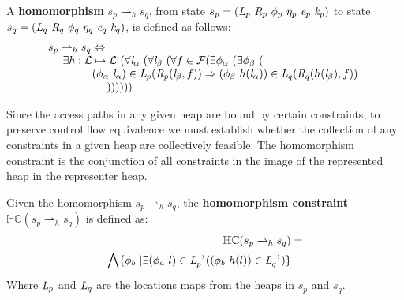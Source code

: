 \begin{definition}
\label{def:homomorphism}
A \textbf{homomorphism} $s_p \rightharpoonup_{h} s_q$, from state $s_p = ( \cfgnt{L}_p\ \cfgnt{R}_p\ \phi_p\ \eta_p\ \cfgnt{e}_p\ \cfgnt{k}_p )$ to state $s_q = ( \cfgnt{L}_q\ \cfgnt{R}_q\ \phi_q\ \eta_q\ \cfgnt{e}_q\ \cfgnt{k}_q )$, is defined as follows: 
$$
\begin{array}{l}
 s_p \rightharpoonup_{h} s_q \Leftrightarrow \\
\ \ \ \ \exists h: \mathcal{L} \mapsto \mathcal{L}\ (\forall \cfgnt{l}_\alpha\ (\forall \cfgnt{l}_\beta\ (\forall f \in \mathcal{F}( \exists \phi_\alpha\ (\exists \phi_\beta\ ( \\ 
\ \ \ \ \ \ \ \ \ \ \ \ (\phi_\alpha\ \cfgnt{l}_\alpha) \in \cfgnt{L}_p(\cfgnt{R}_p (\cfgnt{l}_\beta,f )) \Rightarrow (\phi_\beta\ h(\cfgnt{l}_\alpha))\in \cfgnt{L}_q(\cfgnt{R}_q (h(\cfgnt{l}_\beta),f ))\ \\
\ \ \ \ \ \ \ \ \ \ \ \ \ \ \ \  )) ) ) ) )
\end{array}
$$
\begin{comment}
$$
\begin{array}{l}
s_p \rightharpoonup_{h} s_q \Leftrightarrow \\
\ \ \ \ \exists h: \mathcal{L} \mapsto \mathcal{L}\ (\forall \cfgnt{l}_\beta\ (\forall f \in \mathit{fields}(\mathrm{type}(\cfgnt{l}_\beta))\ ( \\
\ \ \ \ \ \ \ \ \ \ \ \ \forall (\phi_\alpha\ \cfgnt{l}_\alpha) \in \cfgnt{L}_p(\cfgnt{R}_p (\cfgnt{l}_\beta,f ))\ ( \\
\ \ \ \ \ \ \ \ \ \ \ \ \ \ \ \ \exists \phi_\beta\ ((\phi_\beta\ h(\cfgnt{l}_\alpha))\in \cfgnt{L}_q(\cfgnt{R}_q (h(\cfgnt{l}_\beta),f )))))))\\
\end{array}
$$
\end{comment}
\end{definition}

Since the access paths in any given heap are bound by certain constraints, to preserve control flow equivalence we must establish whether the collection of any constraints in a given heap are collectively feasible. The homomorphism constraint is the conjunction of all constraints in the image of the represented heap in the representer heap.

\begin{definition}
\label{def:hc}
Given the homomorphism $s_p \rightharpoonup_{h} s_q$, the \textbf{homomorphism constraint} $\mathbb{HC}(s_p \rightharpoonup_{h} s_q)$ is defined as:
\begin{align*}
\mathbb{HC}(s_p \rightharpoonup_{h} s_q) &= \\
 \bigwedge \{ \phi_b\ | \exists (\phi_a\ l) \in \emph{L}_p^\rightarrow ( (\phi_b\ h(l)) \in \emph{L}_q^\rightarrow)\} 
\end{align*}
Where $\emph{L}_p$ and $\emph{L}_q$ are the locations maps from the heaps in $s_p$ and $s_q$.
\end{definition}

